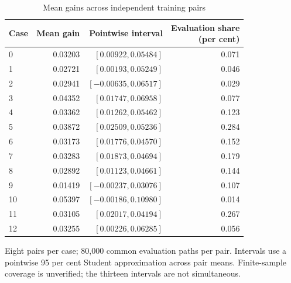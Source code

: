 \documentclass[11pt]{article}
\begin{document}
\begin{table}[htbp]
\centering\small
\caption{Mean gains across independent training pairs}\label{tab:training-evaluation}
\setlength{\tabcolsep}{4pt}
\begin{tabular}{lrrr}
\toprule
Case & Mean gain & Pointwise interval & \shortstack{Evaluation share\\(per cent)} \\
\midrule
0 & 0.03203 & $[0.00922,0.05484]$ & 0.071 \\
1 & 0.02721 & $[0.00193,0.05249]$ & 0.046 \\
2 & 0.02941 & $[-0.00635,0.06517]$ & 0.029 \\
3 & 0.04352 & $[0.01747,0.06958]$ & 0.077 \\
4 & 0.03362 & $[0.01262,0.05462]$ & 0.123 \\
5 & 0.03872 & $[0.02509,0.05236]$ & 0.284 \\
6 & 0.03173 & $[0.01776,0.04570]$ & 0.152 \\
7 & 0.03283 & $[0.01873,0.04694]$ & 0.179 \\
8 & 0.02892 & $[0.01123,0.04661]$ & 0.144 \\
9 & 0.01419 & $[-0.00237,0.03076]$ & 0.107 \\
10 & 0.05397 & $[-0.00186,0.10980]$ & 0.014 \\
11 & 0.03105 & $[0.02017,0.04194]$ & 0.267 \\
12 & 0.03255 & $[0.00226,0.06285]$ & 0.056 \\
\bottomrule
\end{tabular}
\par\smallskip\begin{minipage}{\textwidth}\footnotesize Eight pairs per case; 80,000 common evaluation paths per pair. Intervals use a pointwise 95 per cent Student approximation across pair means. Finite-sample coverage is unverified; the thirteen intervals are not simultaneous.\end{minipage}
\end{table}
\end{document}
